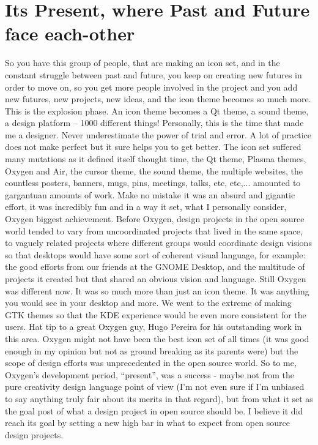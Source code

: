 \section*{Its Present, where Past and Future face each-other}
So you have this group of people, that are making an icon set, and in the constant struggle between past and future, you keep on creating new futures in order to move on, so you get more people involved in the project and you add new futures, new projects, new ideas, and the icon theme becomes so much more. This is the explosion phase. An icon theme becomes a Qt theme, a sound theme, a design platform – 1000 different things!
Personally, this is the time that made me a designer. Never underestimate the power of trial and error. A lot of practice does not make perfect but it sure helps you to get better.
The icon set suffered many mutations as it defined itself thought time, the Qt theme, Plasma themes, Oxygen and Air, the cursor theme, the sound theme, the multiple websites, the countless posters, banners, mugs, pins, meetings, talks, etc, etc,... amounted to gargantuan amounts of work. 
Make no mistake it was an absurd and gigantic effort, it was incredibly fun and in a way it set, what I personally consider, Oxygen biggest achievement.
Before Oxygen, design projects in the open source world tended to vary from uncoordinated projects that lived in the same space, to vaguely related projects where different groups would coordinate design visions so that desktops would have some sort of coherent visual language, for example: the good efforts from our friends at the GNOME Desktop, and the multitude of projects it created but that shared an obvious vision and language.
Still Oxygen was different now. It was so much more than just an icon theme. It was anything you would see in your desktop and more. We went to the extreme of making GTK themes so that the KDE experience would be even more consistent for the users. Hat tip to a great Oxygen guy, Hugo Pereira for his outstanding work in this area.
Oxygen might not have been the best icon set of all times (it was good enough in my opinion but not as ground breaking as its parents were) but the scope of design efforts was unprecedented in the open source world. 
So to me, Oxygen's development period, “present”,  was a success - maybe not from the pure creativity design language point of view (I'm not even sure if I'm unbiased to say anything truly fair about its merits in that regard), but from what it set as the goal post of what a design project in open source should be. I believe it did reach its goal by setting a new high bar in what to expect from open source design projects.

